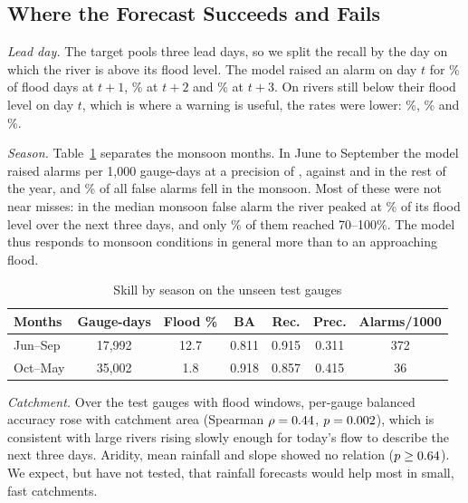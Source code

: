 \documentclass[conference]{IEEEtran}
\begin{document}
\subsection{Where the Forecast Succeeds and Fails}
\textit{Lead day.} The target pools three lead days, so we split the recall by the day on which the river is above its flood level. The model raised an alarm on day $t$ for \LeadOne\% of flood days at $t{+}1$, \LeadTwo\% at $t{+}2$ and \LeadThree\% at $t{+}3$. On rivers still below their flood level on day $t$, which is where a warning is useful, the rates were lower: \LeadOneRise\%, \LeadTwoRise\% and \LeadThreeRise\%.


\textit{Season.} Table~\ref{tab:season} separates the monsoon months. In June to September the model raised \MonAlarms{} alarms per 1,000 gauge-days at a precision of \MonPrec, against \OthAlarms{} and \OthPrec{} in the rest of the year, and \FpMonsoonPct\% of all false alarms fell in the monsoon. Most of these were not near misses: in the median monsoon false alarm the river peaked at \FaRatioMon\% of its flood level over the next three days, and only \NearMissMon\% of them reached 70--100\%. The model thus responds to monsoon conditions in general more than to an approaching flood.

\begin{table}[t]
\caption{Skill by season on the unseen test gauges}
\label{tab:season}
\centering
\footnotesize
\setlength{\tabcolsep}{2.6pt}
\begin{tabular}{lcccccc}
\toprule
Months & Gauge-days & Flood \% & BA & Rec. & Prec. & Alarms/1000\\
\midrule
Jun--Sep & 17,992 & 12.7 & 0.811 & 0.915 & 0.311 & 372\\
Oct--May & 35,002 & 1.8 & 0.918 & 0.857 & 0.415 & 36\\
\bottomrule
\end{tabular}
\end{table}

\textit{Catchment.} Over the \PgGauges{} test gauges with flood windows, per-gauge balanced accuracy rose with catchment area (Spearman $\rho=0.44$, $p=0.002$), which is consistent with large rivers rising slowly enough for today's flow to describe the next three days. Aridity, mean rainfall and slope showed no relation ($p\ge0.64$). We expect, but have not tested, that rainfall forecasts would help most in small, fast catchments.
\end{document}

